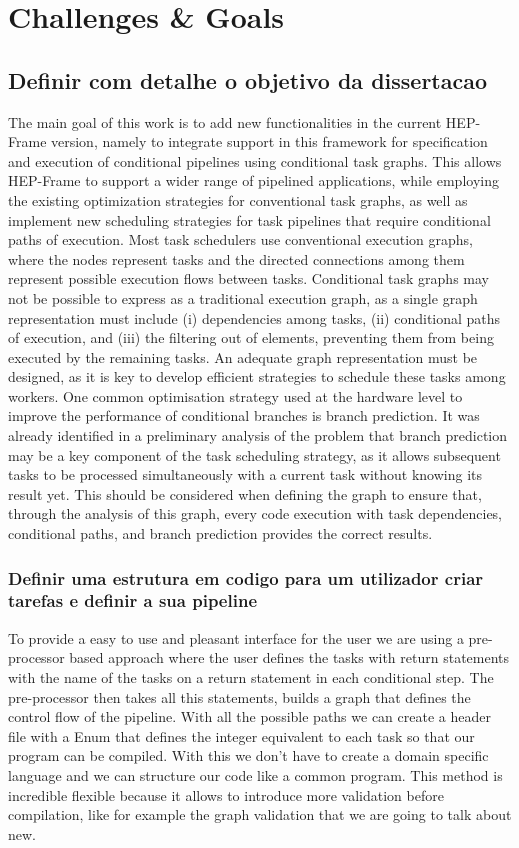 
\section{Challenges \& Goals}


\subsection{ Definir com detalhe o objetivo da dissertacao}
The main goal of this work is to add new functionalities in the current HEP-Frame version, namely to integrate support in this framework for specification and execution of conditional pipelines using conditional task graphs. This allows HEP-Frame to support a wider range of pipelined applications, while employing the existing optimization strategies for conventional task graphs, as well as implement new scheduling strategies for task pipelines that require conditional paths of execution.
Most task schedulers use conventional execution graphs, where  the nodes represent tasks and the directed connections among them represent possible execution flows between tasks. Conditional task graphs may not be possible to express as a traditional execution graph, as a single graph representation must include (i) dependencies among tasks, (ii) conditional paths of execution, and (iii) the filtering out of elements, preventing them from being executed by the remaining tasks. An adequate graph representation must be designed, as it is key to develop efficient strategies to schedule these tasks among workers.
One common optimisation strategy used at the hardware level to improve the performance of conditional branches is branch prediction. It was already identified in a preliminary analysis of the problem that branch prediction may be a key component of the task scheduling strategy, as it allows subsequent tasks to be processed simultaneously with a current task without knowing its result yet. This should be considered when defining the graph to ensure that, through the analysis of this graph, every code execution with task dependencies, conditional paths, and branch prediction provides the correct results.

\subsubsection{Definir uma estrutura em codigo para um utilizador criar tarefas e definir a sua pipeline}
To provide a easy to use and pleasant interface for the user we are using a pre-processor based approach where the user defines the tasks with return statements with the name of the tasks on a return statement in each conditional step. The pre-processor then takes all this statements, builds a graph that defines the control flow of the pipeline. With all the possible paths we can create a header file with a Enum that defines the integer equivalent to each task so that our program can be compiled. With this we don't have to create a domain specific language and we can structure our code like a common program. This method is incredible flexible because it allows to introduce more validation before compilation, like for example the graph validation that we are going to talk about new.

